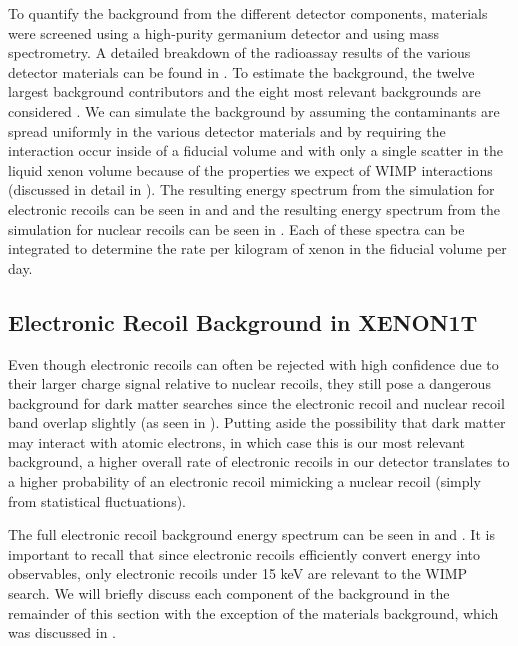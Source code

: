 To quantify the background from the different detector components, materials were screened using a high-purity germanium detector and using mass spectrometry.  A detailed breakdown of the radioassay results of the various detector materials can be found in .  To estimate the background, the twelve largest background contributors and the eight most relevant backgrounds are considered \cite{aprile2016physics}.  We can simulate the background by assuming the contaminants are spread uniformly in the various detector materials and by requiring the interaction occur inside of a fiducial volume and with only a single scatter in the liquid xenon volume because of the properties we expect of WIMP interactions (discussed in detail in ).  The resulting energy spectrum from the simulation for electronic recoils can be seen in  and  and the resulting energy spectrum from the simulation for nuclear recoils can be seen in .  Each of these spectra can be integrated to determine the rate per kilogram of xenon in the fiducial volume per day.


\subsection{Electronic Recoil Background in XENON1T}
\label{sec:xe1t_er_bkg}

Even though electronic recoils can often be rejected with high confidence due to their larger charge signal relative to nuclear recoils, they still pose a dangerous background for dark matter searches since the electronic recoil and nuclear recoil band overlap slightly (as seen in ).  Putting aside the possibility that dark matter may interact with atomic electrons, in which case this is our most relevant background, a higher  overall rate of electronic recoils in our detector translates to a higher probability of an electronic recoil mimicking a nuclear recoil (simply from statistical fluctuations).

The full electronic recoil background energy spectrum can be seen in  and .  It is important to recall that since electronic recoils efficiently convert energy into observables, only electronic recoils under 15 keV are relevant to the WIMP search.  We will briefly discuss each component of the background in the remainder of this section with the exception of the materials background, which was discussed in .

